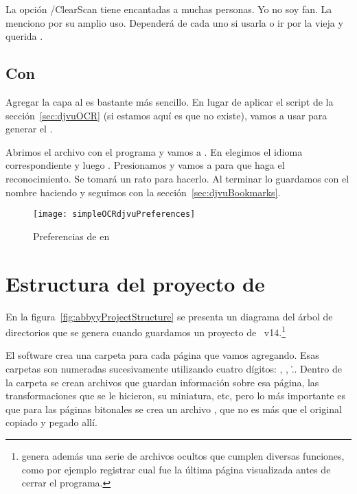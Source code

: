 \documentclass[%
	a5paper,
	10pt,
	twoside,
	openright,
	final,
]{memoir}
\begin{document}
{	La opción /ClearScan tiene encantadas a muchas personas. Yo no soy fan. La menciono por su amplio uso. Dependerá de cada uno si usarla o ir por la vieja y querida .

	\section{Con \djvueditor} Agregar la capa al \djvu es bastante más sencillo. En lugar de aplicar el script de la sección~\ref{sec:djvuOCR} (si estamos aquí es que no existe), vamos a usar \djvueditor para generar el \ocr.

	Abrimos el archivo  con el programa y vamos a . En  elegimos el idioma correspondiente y luego . Presionamos  y vamos a  para que haga el reconocimiento. Se tomará un rato para hacerlo. Al terminar lo guardamos con el nombre  haciendo  y seguimos con la sección~\ref{sec:djvuBookmarks}.

	\begin{figure}
		\texttt{[image: simpleOCRdjvuPreferences]}
		\caption{Preferencias de \ocr en \djvueditor\label{fig:simpleOCRdjvuPreferences}}
	\end{figure}

	\chapter{Estructura del proyecto de \label{sec:abbyyProjectStructure}} En la figura~\ref{fig:abbyyProjectStructure} se presenta un diagrama del árbol de directorios que se genera cuando guardamos un proyecto de \abbyy~v14.\footnote{\abbyy genera además una serie de archivos ocultos que cumplen diversas funciones, como por ejemplo registrar cual fue la última página visualizada antes de cerrar el programa.}

	El software crea una carpeta para cada página que vamos agregando. Esas carpetas son numeradas sucesivamente utilizando cuatro dígitos: , , \... Dentro de la carpeta se crean archivos que guardan información sobre esa página, las transformaciones que se le hicieron, su miniatura, etc, pero lo más importante es que para las páginas bitonales se crea un archivo , que no es más que el \tiff original copiado y pegado allí.

}
\end{document}
